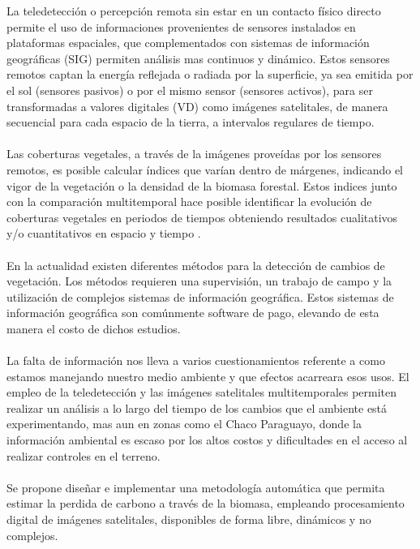 La teledetecci\'on o percepci\'on remota sin estar en un contacto f\'isico directo permite el uso de informaciones provenientes de sensores instalados en plataformas espaciales, que complementados con sistemas de informaci\'on geogr\'aficas (SIG) permiten an\'alisis mas continuos y din\'amico. Estos sensores remotos captan la energ\'ia reflejada o radiada por la superficie, ya sea emitida por el sol (sensores pasivos) o por el mismo sensor (sensores activos), para ser transformadas a valores digitales (VD) como im\'agenes satelitales, de manera secuencial para cada espacio de la tierra, a intervalos regulares de tiempo.\\~\\
Las coberturas vegetales, a trav\'es de la im\'agenes prove\'idas por los sensores remotos, es posible calcular \'indices que var\'ian dentro de m\'argenes, indicando el vigor de la vegetaci\'on o la densidad de la biomasa forestal. Estos indices junto con la comparaci\'on multitemporal hace posible identificar la evoluci\'on de coberturas vegetales en periodos de tiempos obteniendo resultados cualitativos y/o cuantitativos en espacio y tiempo \cite{martinez2013normalizacion}.\\~\\
En la actualidad existen diferentes m\'etodos para la detecci\'on de cambios de vegetaci\'on. Los m\'etodos requieren una supervisi\'on, un trabajo de campo y la utilizaci\'on de complejos sistemas de informaci\'on geogr\'afica. Estos sistemas de información geográfica son com\'unmente software de pago, elevando de esta manera el costo de dichos estudios. \\~\\
La falta de informaci\'on nos lleva a varios cuestionamientos referente a como estamos manejando nuestro medio ambiente y que efectos acarreara esos usos. El empleo de la teledetecci\'on y las im\'agenes satelitales multitemporales permiten realizar un an\'alisis a lo largo del tiempo de los cambios que el ambiente est\'a experimentando, mas aun en zonas como el Chaco Paraguayo, donde la informaci\'on ambiental es escaso por los altos costos y dificultades en el acceso al realizar controles en el terreno.\\~\\
Se propone dise\~{n}ar e implementar una metodolog\'ia autom\'atica que permita estimar la perdida de carbono a trav\'es de la biomasa, empleando procesamiento digital de im\'agenes satelitales, disponibles de forma libre, din\'amicos y no complejos.

